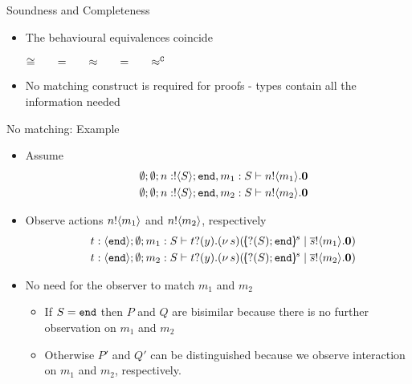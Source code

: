 \documentclass{beamer}
\begin{document}
	\begin{frame}{Soundness and Completeness}
		\begin{itemize}
			\item	The behavioural equivalences coincide

				\begin{theorem}
					\begin{center}
					$\cong \qquad =\qquad \approx \qquad =\qquad \approx^\mathtt{C}$
					\end{center}
				\end{theorem}

			\item	No matching construct is required for proofs - types contain all the information needed

		\end{itemize}
	\end{frame}

	\begin{frame}{No matching: Example}
			\begin{itemize}
				\item	Assume
					\begin{eqnarray*}
						&&\emptyset; \emptyset; n: ! \langle S \rangle ; \mathtt{end}, m_1 : S \vdash n ! \langle m_1 \rangle . \mathbf{0} \\
						&&\emptyset; \emptyset; n: ! \langle S \rangle ; \mathtt{end}, m_2 : S \vdash n ! \langle m_2 \rangle . \mathbf{0}
					\end{eqnarray*}
				\item	Observe actions $n ! \langle m_1 \rangle$ and $n ! \langle m_2 \rangle$, respectively
					\begin{eqnarray*}
						&& t: \chtype{\tinact}; \es; m_1 : S \proves \binp{t}{y} \newsp{s}{\mapchar{\btinp{S} \tinact}{s}\Par \bout{\dual{s}}{m_1}\inact} \\
						&& t: \chtype{\tinact}; \es; m_2 : S \proves \binp{t}{y} \newsp{s}{\mapchar{\btinp{S} \tinact}{s}\Par \bout{\dual{s}}{m_2}\inact} 
					\end{eqnarray*}


				\item	No need for the observer to match $m_1$ and $m_2$
				\begin{itemize}
					\item	If $S = \mathtt{end}$ then $P$ and $Q$ are bisimilar because there is no further observation on $m_1$ and $m_2$
					\item	Otherwise $P'$ and $Q'$ can be distinguished because we observe interaction on $m_1$ and $m_2$,
						respectively.
				\end{itemize}
			\end{itemize}
	\end{frame}
\end{document}

